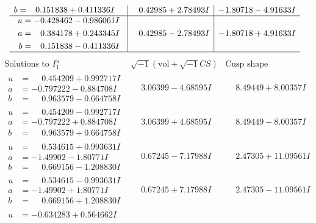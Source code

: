 \documentclass[1p]{elsarticle_modified}
\theoremstyle{definition}
\newcommand{\I}{\sqrt{-1}}
\begin{document}
$$\begin{array}{c|c|c}
\begin{aligned}
b &= \phantom{-}0.151838 + 0.411336 I\end{aligned}
 & \phantom{-}0.42985 + 2.78493 I & -1.80718 - 4.91633 I \\ \hline\begin{aligned}
u &= -0.428462 - 0.986061 I \\
a &= \phantom{-}0.384178 + 0.243345 I \\
b &= \phantom{-}0.151838 - 0.411336 I\end{aligned}
 & \phantom{-}0.42985 - 2.78493 I & -1.80718 + 4.91633 I\\
 \hline 
 \end{array}$$\newpage$$\begin{array}{c|c|c}  
\text{Solutions to }I^u_{1}& \I (\text{vol} + \sqrt{-1}CS) & \text{Cusp shape}\\
 \hline 
\begin{aligned}
u &= \phantom{-}0.454209 + 0.992717 I \\
a &= -0.797222 - 0.884708 I \\
b &= \phantom{-}0.963579 - 0.664758 I\end{aligned}
 & \phantom{-}3.06399 - 4.68595 I & \phantom{-}8.49449 + 8.00357 I \\ \hline\begin{aligned}
u &= \phantom{-}0.454209 - 0.992717 I \\
a &= -0.797222 + 0.884708 I \\
b &= \phantom{-}0.963579 + 0.664758 I\end{aligned}
 & \phantom{-}3.06399 + 4.68595 I & \phantom{-}8.49449 - 8.00357 I \\ \hline\begin{aligned}
u &= \phantom{-}0.534615 + 0.993631 I \\
a &= -1.49902 - 1.80771 I \\
b &= \phantom{-}0.669156 - 1.208830 I\end{aligned}
 & \phantom{-}0.67245 - 7.17988 I & \phantom{-}2.47305 + 11.09561 I \\ \hline\begin{aligned}
u &= \phantom{-}0.534615 - 0.993631 I \\
a &= -1.49902 + 1.80771 I \\
b &= \phantom{-}0.669156 + 1.208830 I\end{aligned}
 & \phantom{-}0.67245 + 7.17988 I & \phantom{-}2.47305 - 11.09561 I \\ \hline\begin{aligned}
u &= -0.634283 + 0.564662 I \\

\end{aligned}
\end{array}$$
\end{document}
